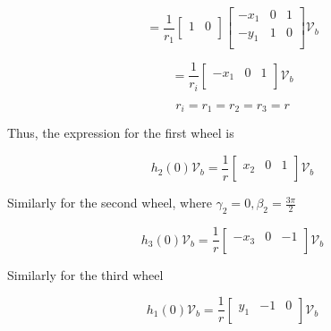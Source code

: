 \documentclass[12pt, twoside]{report}
\begin{document}
\begin{equation}
    = \frac{1}{r_1} \left[\begin{array}{cc}
            1 & 0 \\
        \end{array}\right]
    \begin{bmatrix}
        -x_1 & 0 & 1 \\
        -y_1 & 1 & 0 \\
    \end{bmatrix}
    \mathcal{V}_b
\end{equation}

\begin{equation}
    =
    \frac{1}{r_i}
    \begin{bmatrix}
        -x_1 & 0 & 1 \\
    \end{bmatrix}
    \mathcal{V}_b
\end{equation}

\begin{equation}
    r_i = r_1 = r_2 = r_3 = r
\end{equation}

Thus, the expression for the first wheel is

\begin{equation}
    h_2(0) \mathcal{V}_b = \frac{1}{r}
    \begin{bmatrix}
        x_2 & 0 & 1 \\
    \end{bmatrix}
    \mathcal{V}_b
\end{equation}


Similarly for the second wheel, where $\gamma_2 = 0, \beta_2 = \frac{3\pi}{2}$

\begin{equation}
    h_3(0) \mathcal{V}_b = \frac{1}{r}
    \begin{bmatrix}
        -x_3 & 0 & -1 \\
    \end{bmatrix}
    \mathcal{V}_b
\end{equation}



Similarly for the third wheel

\begin{equation}
    h_1(0) \mathcal{V}_b = \frac{1}{r}
    \begin{bmatrix}
        y_1 & -1 & 0 \\
    \end{bmatrix}
    \mathcal{V}_b
\end{equation}
\end{document}
